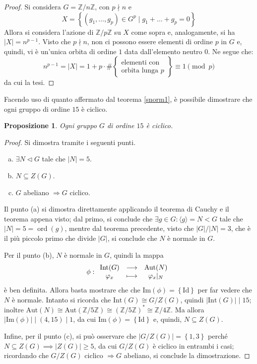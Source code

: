 \documentclass[11pt]{scrartcl}
\theoremstyle{style}
\newtheorem{prop}{Proposizione}[section]
\numberwithin{equation}{subsection}
\begin{document}
	\begin{proof}
		Si considera $G = \mathbb{Z}/ n \mathbb{Z}$, con $p  \nmid n$ e 
		\[
		X = \left\{ (g_1,\ldots,g_p) \in G^p  \mid g_1+ \ldots+ g_p = 0 \right\} 
		\] 
		Allora si considera l'azione di $\mathbb{Z} / p \mathbb{Z}$ su $X$ come sopra e, analogamente, si ha $\lvert X \rvert  = n^{p-1} $.
		Visto che $p \nmid n$, non ci possono essere elementi di ordine $p$ in $G$ e, quindi, vi \`e un'unica orbita di ordine $1$ data dall'elemento neutro $0$.
		Ne segue che:
		\[
		n^{p-1} = \lvert X \rvert  = 1 + p \cdot \# \left\{ \substack{\displaystyle \text{elementi con}\\ \displaystyle \text{orbita lunga } p} \right\} \equiv 1 \pmod{p} 
		\] 
		da cui la tesi.
	\end{proof}
	Facendo uso di quanto affermato dal teorema \ref{snorm1}, \`e possibile dimostrare che ogni gruppo di ordine $15$ \`e ciclico.	
\begin{prop}
	Ogni gruppo $G$ di ordine $15$ \`e ciclico.
\end{prop}
\begin{proof}
	Si dimostra tramite i seguenti punti.
	\begin{enumerate}[(a).]
		\item $\exists N \lhd G$ tale che $\lvert N \rvert  = 5$.
		\item $N \subseteq Z(G)$.
		\item $G$ abeliano $\Rightarrow  G $ ciclico.
	\end{enumerate}
	Il punto (a) si dimostra direttamente applicando il teorema di Cauchy e il teorema appena visto; dal primo, si conclude che $\exists g \in G: \langle g \rangle= N < G$ tale che $\lvert N \rvert  = 5=\operatorname{ord}(g)$, mentre dal teorema precedente, visto che $\lvert G \rvert  / \lvert N \rvert  = 3$, che \`e il pi\`u piccolo primo che divide $\lvert G \rvert $, si conclude che $N$ \`e normale in $G$.

	Per il punto (b), $N$ \`e normale in $G$, quindi la mappa 
	\[
\phi : 
		\begin{array}
			{c c c}
			\mathrm{Int} (G)& \longrightarrow &\mathrm{Aut} (N)\\
			\varphi _x &\longmapsto& \varphi _x |_{N} 
		\end{array}
	\] 
	\`e ben definita.
	Allora basta mostrare che che $\mathrm{Im} (\phi ) = \left\{ \mathrm{Id}  \right\} $ per far vedere che $N$ \`e normale.
	Intanto si ricorda che $\mathrm{Int} (G) \cong G / Z(G)$, quindi $\lvert \mathrm{Int} (G) \rvert  \mid 15$; inoltre $\mathrm{Aut} (N) \cong \mathrm{Aut} (\mathbb{Z}/5\mathbb{Z}) \cong (\mathbb{Z}/5\mathbb{Z})^* \cong \mathbb{Z}/4\mathbb{Z}$.
	Ma allora $|\mathrm{Im} (\phi )|  \mid (4,15)  \mid  1$, da cui $\mathrm{Im} (\phi ) = \left\{ \mathrm{Id}  \right\} $ e, quindi, $N \subseteq Z(G)$.

	Infine, per il punto (c), si pu\`o osservare che $\lvert G / Z(G) \rvert = \left\{ 1,3 \right\} $ perch\'e $N \subseteq Z(G) \implies \lvert Z(G) \rvert \ge 5$, da cui $G / Z(G)$ \`e ciclico in entrambi i casi; ricordando che $G / Z(G)$ ciclico $\Rightarrow  G$ abeliano, si conclude la dimostrazione.
\end{proof}
\end{document}

